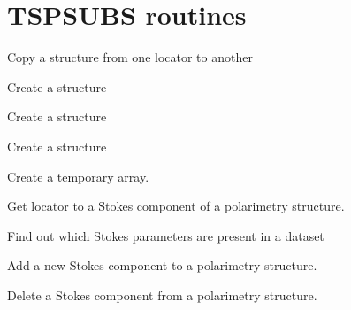 \newpage

\section{TSPSUBS routines}

\begin{mansectionroutines}
     Copy a {} structure from one locator to another

     Create a {} {} structure

     Create a {} {} structure

     Create a {} {} structure

     Create a temporary array.

\end{mansectionroutines}
\begin{mansectionroutines}
     Get locator to a Stokes component of a polarimetry structure.

     Find out which Stokes parameters are present in a dataset

     Add a new Stokes component to a polarimetry structure.

     Delete a Stokes component from a polarimetry structure.

\end{mansectionroutines}
